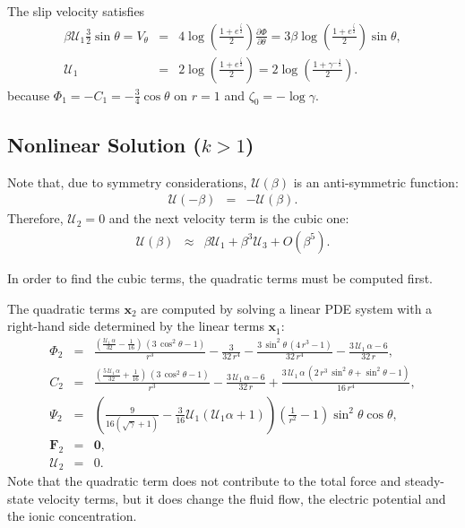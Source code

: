 \documentclass[final]{elsarticle}
\newcommand{\deriv}[2]{\frac{\partial #1}{\partial #2}}
\newcommand{\pars}[1]{\left(#1\right)}
\newcommand\bF{\boldsymbol{F}}
\newcommand\bx{\boldsymbol{x}}
\newcommand\bzero{\boldsymbol{0}}
\newcommand\cU{\mathscr{U}}
\begin{document}
The slip velocity satisfies
\begin{eqnarray*}
\beta \cU_1 \frac{3}{2} \sin\theta =
V_\theta &=& 4 \log \pars{\frac{1 + e ^ \frac{\zeta}{2}}{2}} \deriv{\varPhi}{\theta} 
=
 3 \beta \log \pars{\frac{1 + e ^ \frac{\zeta}{2}}{2}} \sin\theta, \\
\cU_1 &=& 2 \log \pars{\frac{1 + e ^ \frac{\zeta}{2}}{2}} 
       =  2 \log \pars{\frac{1 + \gamma ^ {-\frac{1}{2}}}{2}}.
\end{eqnarray*}
because $\varPhi_1 = -C_1 = -\frac{3}{4} \cos\theta$ on $r=1$
and $\zeta_0 = -\log\gamma$.

\subsection{Nonlinear Solution ($k > 1$)} \label{app:cubic}
Note that, due to symmetry considerations, $\cU(\beta)$ is an anti-symmetric function:
\begin{eqnarray*}
\cU(-\beta) &=& -\cU(\beta).
\end{eqnarray*}
Therefore, $\cU_2 = 0$ and the next velocity term is the cubic one:
\begin{eqnarray*}
\cU(\beta) &\approx& \beta \cU_1 + \beta^3 \cU_3 + O(\beta^5).
\end{eqnarray*}

In order to find the cubic terms, the quadratic terms must be computed first.

The quadratic terms $\bx_2$ are computed by solving a linear PDE system 
with a right-hand side determined by the linear terms $\bx_1$:
\begin{eqnarray*}
\varPhi_2 &=& \frac{\left(\frac{\cU_1\, \alpha}{32} - \frac{1}{16}\right)\, \left(3\, {\cos^2\theta} - 1\right)}{r^3} - \frac{3}{32\, r^4} - \frac{3\, {\sin^2\theta}\, \left(4\, r^3 - 1\right)}{32\, r^4} - \frac{3\, \cU_1\, \alpha - 6}{32\, r},
\\
C_2 &=& \frac{\left(\frac{5\, \cU_1\, \alpha}{32} + \frac{1}{16}\right)\, \left(3\, {\cos^2\theta} - 1\right)}{r^3} - \frac{3\, \cU_1\, \alpha - 6}{32\, r} + \frac{3\, \cU_1\, \alpha\, \left(2\, r^3\, {\sin^2\theta} + {\sin^2\theta} - 1\right)}{16\, r^4},
\\
\Psi_2 &=& \pars{\frac{9}{16(\sqrt{\gamma}+1)} - \frac{3}{16} \cU_1 (\cU_1 \alpha + 1)}
 \left(\frac{1}{r^2} - 1\right) \sin^2\theta \cos\theta,  \\
\bF_2 &=& \bzero, \\ \cU_2 &=& 0.
\end{eqnarray*}
Note that the quadratic term does not contribute to the total force and steady-state 
velocity terms, but it does change the fluid flow, 
the electric potential and the ionic concentration.
\end{document}
